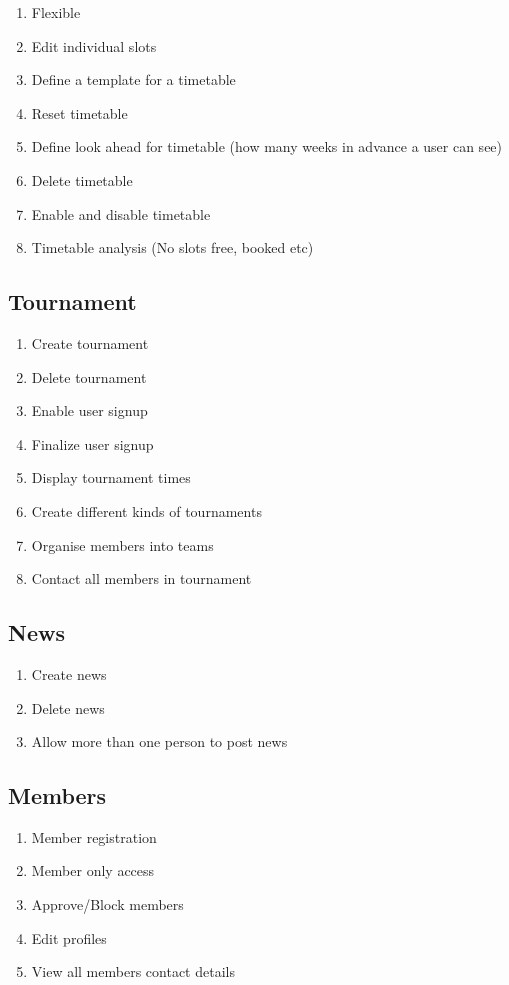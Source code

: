 \begin{enumerate}
\item Flexible 
\item Edit individual slots
\item Define a template for a timetable
\item Reset timetable
\item Define look ahead for timetable (how many weeks in advance a user can see)
\item Delete timetable
\item Enable and disable timetable
\item Timetable analysis (No slots free, booked etc)
\end{enumerate}

\subsection{Tournament}

\begin{enumerate}
\item Create tournament
\item Delete tournament
\item Enable user signup
\item Finalize user signup
\item Display tournament times
\item Create different kinds of tournaments
\item Organise members into teams
\item Contact all members in tournament
\end{enumerate}


\subsection{News}

\begin{enumerate}
\item Create news
\item Delete news
\item Allow more than one person to post news
\end{enumerate}

\subsection{Members}

\begin{enumerate}
\item Member registration
\item Member only access
\item Approve/Block members
\item Edit profiles
\item View all members contact details
\end{enumerate}

